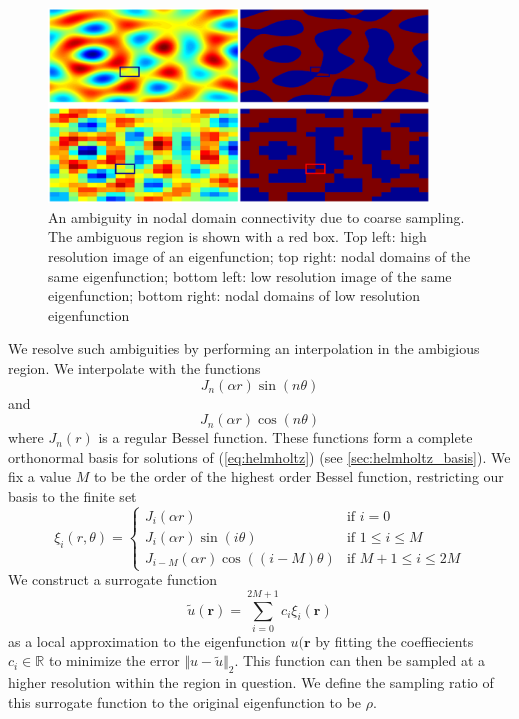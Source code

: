 \documentclass{report}
\newcommand{\rr}[0]{\mathbf{r}}
\begin{document}
\begin{figure}[h!]
  \begin{center}
    \includegraphics[width=0.9\textwidth]{figs/interpolation_sample.eps}
    \caption{An ambiguity in nodal domain connectivity due to coarse sampling. The ambiguous region is shown with a red box. Top left: high resolution image of an eigenfunction; top right: nodal domains of the same eigenfunction; bottom left: low resolution image of the same eigenfunction; bottom right: nodal domains of low resolution eigenfunction}
    \label{fig:interpolation_sample}
  \end{center}
\end{figure}

We resolve such ambiguities by performing an interpolation in the ambigious region. We interpolate with the functions
\[
J_{n}(\alpha r) \sin(n \theta)
\]
and
\[
J_{n}(\alpha r) \cos(n \theta)
\]
where $J_{n}(r)$ is a regular Bessel function. These functions form a complete orthonormal basis for solutions of (\ref{eq:helmholtz}) (see \ref{sec:helmholtz_basis}). We fix a value $M$ to be the order of the highest order Bessel function, restricting our basis to the finite set
\begin{equation}
  \label{eq:interp_functions}
  \xi_{i}(r, \theta)=\begin{cases}
  J_{i}(\alpha r) & \text{if }i=0\\
  J_{i}(\alpha r)\sin(i\theta) & \text{if }1 \le i \le M\\
  J_{i-M}(\alpha r)\cos((i-M)\theta) & \text{if }M+1 \le i \le 2M
  \end{cases}
\end{equation}
We construct a surrogate function
\[
  \tilde{u}(\rr) = \sum_{i=0}^{2M+1} c_{i} \xi_{i}(\rr)
\]
as a local approximation to the eigenfunction $u(\rr$ by fitting the coeffiecients $c_{i} \in \mathbb{R}$ to minimize the error $\Vert u - \tilde{u} \Vert_{2}$. This function can then be sampled at a higher resolution within the region in question. We define the sampling ratio of this surrogate function to the original eigenfunction to be $\rho$.
\end{document}
